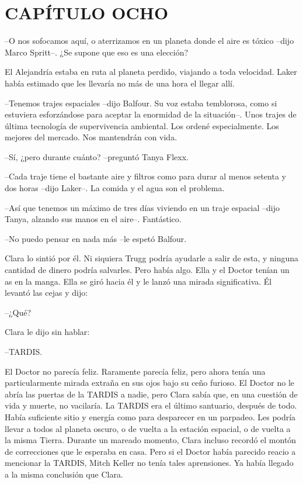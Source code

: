 \chapter*{CAPÍTULO OCHO}

{--O nos sofocamos aquí, o aterrizamos en un planeta donde el aire es
tóxico --dijo Marco Spritt--. ¿Se supone que eso es una elección?}

{El Alejandría estaba en ruta al planeta perdido, viajando a toda
 velocidad. Laker había estimado que les llevaría no más de una hora el
llegar allí.}

{--Tenemos trajes espaciales --dijo Balfour. Su voz estaba temblorosa,
 como si estuviera esforzándose para aceptar la enormidad de la
 situación--. Unos trajes de última tecnología de supervivencia
 ambiental. Los ordené especialmente. Los mejores del mercado. Nos
mantendrán con vida.}

{--Sí, ¿pero durante cuánto? --preguntó Tanya Flexx.}

{--Cada traje tiene el bastante aire y filtros como para durar al menos
 setenta y dos horas --dijo Laker--. La comida y el agua son el
problema.}

{--Así que tenemos un máximo de tres días viviendo en un traje espacial
--dijo Tanya, alzando sus manos en el aire--. Fantástico.}

{--No puedo pensar en nada más --le espetó Balfour.}

{Clara lo sintió por él. Ni siquiera Trugg podría ayudarle a salir de
 esta, y ninguna cantidad de dinero podría salvarles. Pero había algo.
 Ella y el Doctor tenían un as en la manga. Ella se giró hacia él y le
lanzó una mirada significativa. Él levantó las cejas y dijo:}

{--¿Qué?}

{Clara le dijo sin hablar:}

{--TARDIS.}

{El Doctor no parecía feliz. Raramente parecía feliz, pero ahora tenía
 una particularmente mirada extraña en sus ojos bajo su ceño furioso. El
 Doctor no le abría las puertas de la TARDIS a nadie, pero Clara sabía
 que, en una cuestión de vida y muerte, no vacilaría. La TARDIS era el
 último santuario, después de todo. Había suficiente sitio y energía como
 para desparecer en un parpadeo. Les podría llevar a todos al planeta
 oscuro, o de vuelta a la estación espacial, o de vuelta a la misma
 Tierra. Durante un mareado momento, Clara incluso recordó el montón de
 correcciones que le esperaba en casa. Pero si el Doctor había parecido
 reacio a mencionar la TARDIS, Mitch Keller no tenía tales aprensiones.
Ya había llegado a la misma conclusión que Clara.}

